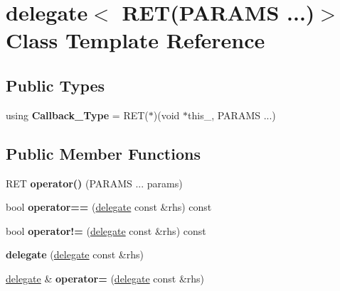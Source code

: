 \hypertarget{classdelegate_3_01RET_07PARAMS_01_8_8_8_08_4}{}\section{delegate$<$ R\+ET(P\+A\+R\+A\+MS ...)$>$ Class Template Reference}
\label{classdelegate_3_01RET_07PARAMS_01_8_8_8_08_4}
\subsection*{Public Types}
\begin{DoxyCompactItemize}
\item 
\mbox{\label{classdelegate_3_01RET_07PARAMS_01_8_8_8_08_4_adf00092da1929c23d5f83e834da9c829}} 
using {\bfseries Callback\+\_\+\+Type} = R\+ET($\ast$)(void $\ast$this\+\_\+, P\+A\+R\+A\+MS ...)
\end{DoxyCompactItemize}
\subsection*{Public Member Functions}
\begin{DoxyCompactItemize}
\item 
\mbox{\label{classdelegate_3_01RET_07PARAMS_01_8_8_8_08_4_ae1ec43861ae3d96da8e94bafe23bd955}} 
R\+ET {\bfseries operator()} (P\+A\+R\+A\+MS ... params)
\item 
\mbox{\label{classdelegate_3_01RET_07PARAMS_01_8_8_8_08_4_ac39831a0a905dc487004212841b64492}} 
bool {\bfseries operator==} (\hyperlink{classdelegate}{delegate} const \&rhs) const
\item 
\mbox{\label{classdelegate_3_01RET_07PARAMS_01_8_8_8_08_4_a816e94b56f5e1b401775099368d6210c}} 
bool {\bfseries operator!=} (\hyperlink{classdelegate}{delegate} const \&rhs) const
\item 
\mbox{\label{classdelegate_3_01RET_07PARAMS_01_8_8_8_08_4_afc0bb34c9c6fbeecf671db1a8a4a0c17}} 
{\bfseries delegate} (\hyperlink{classdelegate}{delegate} const \&rhs)
\item 
\mbox{\label{classdelegate_3_01RET_07PARAMS_01_8_8_8_08_4_a12809469ad36708a7a5245842c2c55db}} 
\hyperlink{classdelegate}{delegate} \& {\bfseries operator=} (\hyperlink{classdelegate}{delegate} const \&rhs)
\end{DoxyCompactItemize}
